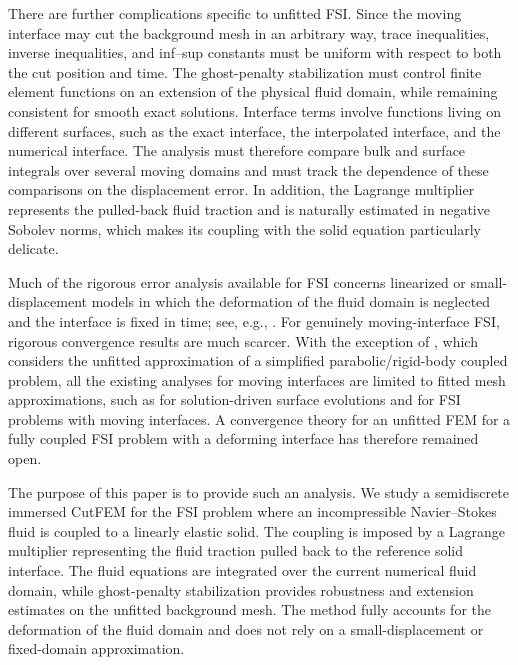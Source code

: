 \documentclass[11pt,reqno]{amsart}
\theoremstyle{definition}
\theoremstyle{plain}
\numberwithin{theorem}{section}
\numberwithin{proposition}{section}
\numberwithin{lemma}{section}
\numberwithin{equation}{section}
\renewcommand{\(}{\bigl(}
\renewcommand{\)}{\bigr)}
\begin{document}
There are further complications specific to unfitted FSI. Since the moving interface may
cut the background mesh in an arbitrary way, trace inequalities, inverse inequalities, and
inf--sup constants must be uniform with respect to both the cut position and time. The
ghost-penalty stabilization must control finite element functions on an extension of the
physical fluid domain, while remaining consistent for smooth exact solutions. Interface
terms involve functions living on different surfaces, such as the exact interface, the interpolated interface, and the numerical
interface. The analysis must therefore compare bulk and surface
integrals over several moving domains and must track the dependence of these comparisons
on the displacement error. In addition, the Lagrange multiplier represents the pulled-back
fluid traction and is naturally estimated in negative Sobolev norms, which makes its
coupling with the solid equation particularly delicate.

Much of the rigorous error analysis available for FSI concerns linearized or
small-displacement models in which the deformation of the fluid domain is neglected and
the interface is fixed in time; see, e.g.,
\cite{letallec-mani-00,du-gunzburger-hou-lee-04,astorino-grandmont-10,fernandez-13,burman-fernandez-14,fernandez-mullaert-15,bukac-muha-16,GONZALEZ2018275,bukac-canic-21,burman2023convergence,annese2023splitting,burman2022fully,li-sun-xie-yu-24}.
For genuinely moving-interface FSI, rigorous convergence results are much scarcer.
With the exception of  \cite{von-wahl-richter-23}, which considers the unfitted approximation of a simplified parabolic/rigid-body coupled problem, all the existing analyses for moving interfaces are limited to fitted
mesh approximations, such as \cite{KLLP-2017,Li-Tang-2025,Gao-Li-Tang-2025} for solution-driven surface evolutions and \cite{MR2437776,buyang-fsi-ale} for FSI problems with moving interfaces. A convergence theory for an unfitted
FEM for a fully coupled FSI problem with a deforming interface has
therefore remained open.

The purpose of this paper is to provide such an analysis. We study a semidiscrete
immersed CutFEM for the FSI problem where an incompressible Navier--Stokes fluid is coupled to a linearly elastic
solid. The coupling is imposed by a Lagrange multiplier representing the fluid traction
pulled back to the reference solid interface. The fluid equations are integrated over the
current numerical fluid domain, while ghost-penalty stabilization provides robustness and
extension estimates on the unfitted background mesh. The method fully accounts for the
deformation of the fluid domain and does not rely on a small-displacement or fixed-domain
approximation.
\end{document}
